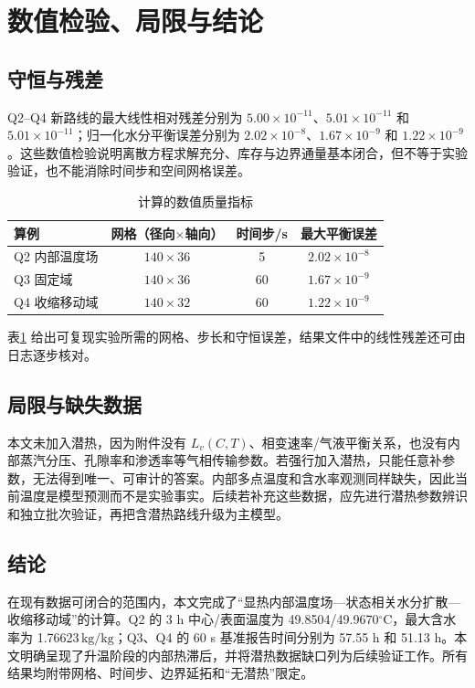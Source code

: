 \documentclass[withoutpreface,bwprint]{cumcmthesis}
\newcommand{\kgkg}{\ensuremath{\mathrm{kg/kg}}}
\begin{document}
\section{数值检验、局限与结论}
\subsection{守恒与残差}
Q2--Q4 新路线的最大线性相对残差分别为 $5.00\times10^{-11}$、$5.01\times10^{-11}$ 和 $5.01\times10^{-11}$；归一化水分平衡误差分别为 $2.02\times10^{-8}$、$1.67\times10^{-9}$ 和 $1.22\times10^{-9}$。这些数值检验说明离散方程求解充分、库存与边界通量基本闭合，但不等于实验验证，也不能消除时间步和空间网格误差。
\begin{table}[H]\centering\caption{计算的数值质量指标}\label{tab:checks}
\begin{tabular}{lccc}\toprule
算例&网格（径向$\times$轴向）&时间步/s&最大平衡误差\\\midrule
Q2 内部温度场&$140\times36$&5&$2.02\times10^{-8}$\\
Q3 固定域&$140\times36$&60&$1.67\times10^{-9}$\\
Q4 收缩移动域&$140\times32$&60&$1.22\times10^{-9}$\\
\bottomrule\end{tabular}\end{table}
表\ref{tab:checks} 给出可复现实验所需的网格、步长和守恒误差，结果文件中的线性残差还可由日志逐步核对。

\subsection{局限与缺失数据}
本文未加入潜热，因为附件没有 $L_v(C,T)$、相变速率/气液平衡关系，也没有内部蒸汽分压、孔隙率和渗透率等气相传输参数。若强行加入潜热，只能任意补参数，无法得到唯一、可审计的答案。内部多点温度和含水率观测同样缺失，因此当前温度是模型预测而不是实验事实。后续若补充这些数据，应先进行潜热参数辨识和独立批次验证，再把含潜热路线升级为主模型。

\subsection{结论}
在现有数据可闭合的范围内，本文完成了“显热内部温度场—状态相关水分扩散—收缩移动域”的计算。Q2 的 3 h 中心/表面温度为 49.8504/49.9670\(^{\circ}\mathrm C\)，最大含水率为 1.76623\,\kgkg；Q3、Q4 的 60 s 基准报告时间分别为 57.55 h 和 51.13 h。本文明确呈现了升温阶段的内部热滞后，并将潜热数据缺口列为后续验证工作。所有结果均附带网格、时间步、边界延拓和“无潜热”限定。
\end{document}
